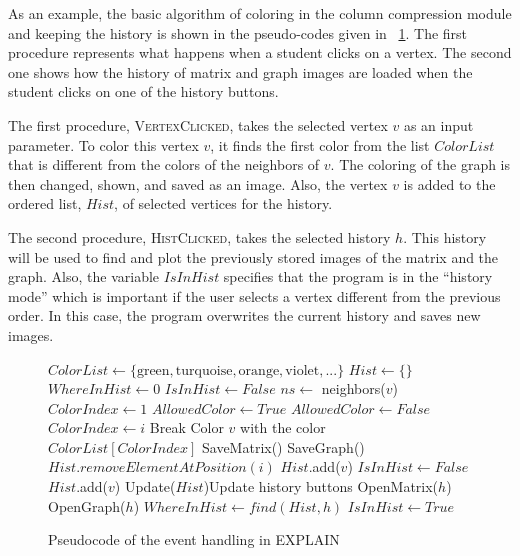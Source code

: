 \documentclass[12pt, twoside,a4paper,toc=bibliography]{scrbook}
\begin{document}
As an example,
the basic algorithm of coloring in the column compression module and
keeping the history is shown in the pseudo-codes given in \figurename~\ref{f:alg}. The first procedure represents what happens when a student clicks on a vertex. The second one shows how the history of matrix and graph images are loaded when the student clicks on one of the history buttons.

The first procedure, \textsc{VertexClicked}, takes the selected vertex $v$ as an input parameter. To color this vertex $v$, it finds the first color from the list $ColorList$ that is different from the colors of the neighbors of $v$. The coloring of the graph is then changed, shown, and saved as an image.
Also, the vertex $v$ is added to the ordered list, $Hist$, of selected vertices for the history.

The second procedure, \textsc{HistClicked}, takes the selected history $h$. This history will be used to find and plot the previously stored images of the matrix and the graph. Also, the variable $IsInHist$ specifies that the program is in the ``history mode'' which is important if the user selects a vertex different from the previous order. In this case, the program overwrites the current history and saves new images.

\begin{figure}
\centering
\begin{algorithmic}[1]
\State $ColorList \gets \{\text{green}, \text{turquoise}, \text{orange}, \text{violet}, ...\}$
\State $Hist \gets \{\}$
\State $WhereInHist \gets 0$
\State $IsInHist \gets False$
\State
{}
\State $ns\gets$ neighbors($v$)
\State $ColorIndex \gets 1$
\State $AllowedColor \gets True$
\State $AllowedColor \gets False$
\EndIf
\EndFor
{}
\State $ColorIndex \gets i$
\State Break
\EndIf
\EndFor
\State Color $v$ with the color $ColorList[ColorIndex]$
\State
{}
\State SaveMatrix()
\State SaveGraph()
\EndIf
{}
\State $Hist.removeElementAtPosition(i)$
\EndFor
\State $Hist$.add($v$)
\State $IsInHist \gets False$
\Else
\State $Hist$.add($v$)
\EndIf
\State Update($Hist$)\Comment Update history buttons
\EndProcedure
\State
\State
{}
\State OpenMatrix($h$)
\State OpenGraph($h$)
\State $WhereInHist \gets find(Hist,h)$
\State $IsInHist \gets True$
\EndProcedure
\end{algorithmic}
\caption{Pseudocode of the event handling in EXPLAIN}
\label{f:alg}
\end{figure}
\end{document}
